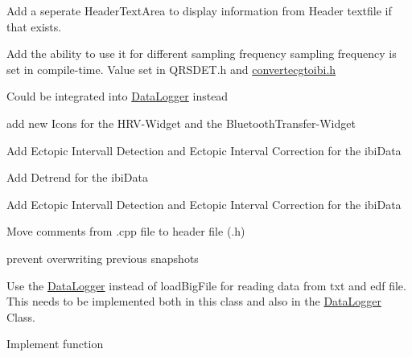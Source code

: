 \begin{DoxyRefList}
Add a seperate Header\+Text\+Area to display information from Header textfile if that exists. 

Add the ability to use it for different sampling frequency sampling frequency is set in compile-\/time. Value set in Q\+R\+S\+D\+E\+T.\+h and \hyperlink{convertecgtoibi_8h}{convertecgtoibi.\+h}  
\item[\label{todo__todo000018}%
\hypertarget{todo__todo000018}{}%
Class \hyperlink{classLoadBigFile}{Load\+Big\+File} ]Could be integrated into \hyperlink{classDataLogger}{Data\+Logger} instead  
\item[\label{todo__todo000019}%
\hypertarget{todo__todo000019}{}%
Class \hyperlink{classMainWindow}{Main\+Window} ]add new Icons for the H\+R\+V-\/\+Widget and the Bluetooth\+Transfer-\/\+Widget 
\item[\label{todo__todo000016}%
\hypertarget{todo__todo000016}{}%
global\+Scope$>$ Member \hyperlink{group__HRV-Analysis_ga3cfec29967efe1561722a05d03f26158}{perform\+Freq\+Domain\+Hrv} (const Q\+Vector$<$ double $>$ $\ast$ibi\+Data, const Q\+Vector$<$ double $>$ $\ast$time\+Data, struct\+Freq\+\_\+T $\ast$output)]Add Ectopic Intervall Detection and Ectopic Interval Correction for the ibi\+Data 

Add Detrend for the ibi\+Data 
\item[\label{todo__todo000015}%
\hypertarget{todo__todo000015}{}%
global\+Scope$>$ Member \hyperlink{group__HRV-Analysis_ga2bd6c358a622e01babb7fdbca313c50f}{perform\+Time\+Domain\+Hrv} (const Q\+Vector$<$ double $>$ $\ast$ibi\+Data, struct0\+\_\+T $\ast$output)]Add Ectopic Intervall Detection and Ectopic Interval Correction for the ibi\+Data 
\item[\label{todo__todo000023}%
\hypertarget{todo__todo000023}{}%
Class \hyperlink{classPlotAndCaptureWidget}{Plot\+And\+Capture\+Widget} ]Move comments from .cpp file to header file (.h)  
\item[\label{todo__todo000024}%
\hypertarget{todo__todo000024}{}%
Member \hyperlink{classPlotAndCaptureWidget_a77ecf5a130215ce0246b8817e44081f7}{Plot\+And\+Capture\+Widget\+:\+:take\+Screen} ()]prevent overwriting previous snapshots  
\item[\label{todo__todo000025}%
\hypertarget{todo__todo000025}{}%
Class \hyperlink{classPlottingWidget}{Plotting\+Widget} ]Use the \hyperlink{classDataLogger}{Data\+Logger} instead of load\+Big\+File for reading data from txt and edf file. This needs to be implemented both in this class and also in the \hyperlink{classDataLogger}{Data\+Logger} Class. 
\item[\label{todo__todo000030}%
\hypertarget{todo__todo000030}{}%
Member \hyperlink{classSamplingThread_aade561b442e580b0ca4af112de2d7a41}{Sampling\+Thread\+:\+:close} ()]Implement function 


\end{DoxyRefList}
